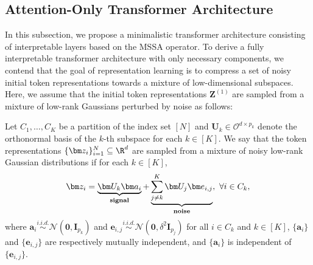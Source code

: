 \documentclass[../../book-main.tex]{subfiles}
\begin{document}




\subsection{Attention-Only Transformer Architecture} \label{sub:aot}

In this subsection, we propose a minimalistic transformer architecture consisting of interpretable layers based on the MSSA operator. To derive a fully interpretable transformer architecture with only necessary components,
we contend that the goal of representation learning is to compress a set of noisy initial token representations towards a mixture of low-dimensional subspaces. %
Here, we assume that the initial token representations $\bm Z^{(1)}$ are sampled from a mixture of low-rank Gaussians perturbed by noise as follows: 
\begin{definition}\label{def:MoG}
Let $C_1,\dots,C_K$ be a partition of the index set $[N]$ and $\bm U_k \in \mathcal{O}^{d \times p_k}$ denote the orthonormal basis of the $k$-th subspace for each $k \in [K]$. We say that the token representations $\{\bm z_i \}_{i=1}^N \subseteq \R^d$ are sampled from a mixture of noisy low-rank Gaussian distributions if for each $k \in [K]$,
\begin{align}\label{eq:MoG}
    \bm z_i = \underbrace{\bm U_{k} \bm a_i}_{\bf signal} + \underbrace{\sum_{j \neq k}^K \bm U_j \bm e_{i,j}}_{\bf noise},\ \forall i \in C_k, 
\end{align}
where $\bm{a}_i \overset{i.i.d.}{\sim} \mathcal{N}(\bm{0},\bm{I}_{p_k})$ and $\bm{e}_{i,j} \overset{i.i.d.}{\sim} \mathcal{N}(\bm{0},\delta^2\bm{I}_{p_j})$ for all $i \in C_k$ and $k \in [K]$, $\{\bm{a}_i\}$ and $\{\bm{e}_{i,j}\}$ are respectively mutually independent, and $\{\bm{a}_i\}$ is independent of $\{\bm{e}_{i,j}\}$.         
\end{definition}
\end{document}
